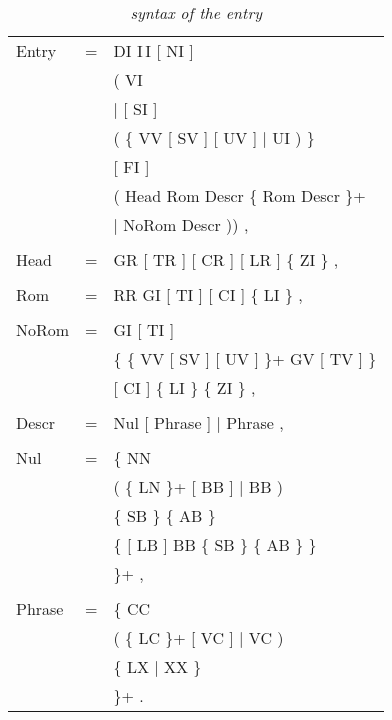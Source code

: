 \begin{table}[htb]
\centering
\begin{tabular}{lcl} 
 Entry  &=& DI I\,I [ NI ]\\
        & & ( VI\\
        & & $|$ [ SI ]\\
        & & \hspace{2mm} ( \{ VV [ SV ] [ UV ] $|$ UI ) \} \\
        & & \hspace{2mm} [ FI ]\\
        & & \hspace{2mm} ( Head Rom Descr \{ Rom Descr \}+ \\
        & & \hspace{2mm} $|$ NoRom Descr )) ,\\ 
        & & \\
 Head   &=& GR [ TR ] [ CR ] [ LR ] \{ ZI \} , \\ 
        & & \\
 Rom    &=& RR GI [ TI ] [ CI ] \{ LI \} ,\\ 
        & & \\
 NoRom  &=& GI [ TI ]\\
        & & \{ \{ VV [ SV ] [ UV ] \}+ GV [ TV ] \}\\
        & & [ CI ] \{ LI \} \{ ZI \} ,\\ 
        & & \\
 Descr  &=& Nul [ Phrase ] $|$ Phrase ,\\ 
        & & \\
 Nul    &=& \{ NN\\
        & & \hspace{2mm} ( \{ LN \}+ [ BB ] $|$ BB )\\
        & & \hspace{2mm} \{ SB \} \{ AB \} \\
        & & \hspace{2mm} \{ [ LB ] BB \{ SB \} \{ AB \} \} \\
        & & \}+ ,\\ 
        & & \\
 Phrase &=& \{ CC\\
        & & \hspace{2mm} ( \{ LC \}+ [ VC ] $|$ VC ) \\
        & & \hspace{2mm} \{ LX $|$ XX \} \\
        & & \}+ . \\ 
\end{tabular} 
\caption{{\em syntax of the entry}}
\end{table}

